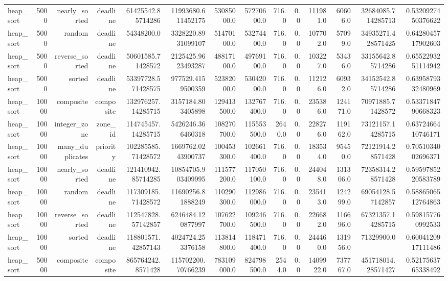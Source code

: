 \begin{table}[htbp]
\begin{tabular}{lrrrrrrrrrrrrr}
heap_sort & 5000 & nearly_sorted & deadline & 61425542.85714286 & 11993680.611452175 & 53085000.0 & 57270600.0 & 716.0 & 0.0 & 111981.0 & 60606.0 & 32684085.714285713 & 0.5320927450376622 \\
heap_sort & 5000 & random & deadline & 54348200.0 & 3328220.8931099107 & 51470100.0 & 53274400.0 & 716.0 & 0.0 & 107702.0 & 57099.0 & 34935271.428571425 & 0.6428045717902603 \\
heap_sort & 5000 & reverse_sorted & deadline & 50601585.71428572 & 2125425.9623493287 & 48817100.0 & 49769100.0 & 716.0 & 0.0 & 103227.0 & 53436.0 & 33155642.85714286 & 0.6552293251114942 \\
heap_sort & 5000 & sorted & deadline & 53397728.571428575 & 977529.4159500359 & 52382000.0 & 53042000.0 & 716.0 & 0.0 & 112126.0 & 60932.0 & 34152542.85714286 & 0.6395879332480969 \\
heap_sort & 10000 & composite & composite & 132976257.14285715 & 3157184.803405898 & 129413500.0 & 132767400.0 & 716.0 & 0.0 & 235386.0 & 124171.0 & 70971885.71428572 & 0.5337184790668323 \\
heap_sort & 10000 & integer_zone & zone_id & 114745457.14285715 & 5426246.366460318 & 108270700.0 & 115553500.0 & 2640.0 & 0.0 & 228276.0 & 119162.0 & 73121157.14285715 & 0.6372466410746171 \\
heap_sort & 10000 & many_duplicates & priority & 102285585.71428572 & 1669762.0243900737 & 100453300.0 & 102661400.0 & 716.0 & 0.0 & 183534.0 & 95450.0 & 72121914.28571428 & 0.7051034002696371 \\
heap_sort & 10000 & nearly_sorted & deadline & 121410942.85714285 & 10854705.903409995 & 111577200.0 & 117050100.0 & 716.0 & 0.0 & 244048.0 & 131306.0 & 72358314.28571428 & 0.5959785220583789 \\
heap_sort & 10000 & random & deadline & 117309185.71428572 & 11690256.81888249 & 110290300.0 & 112986000.0 & 716.0 & 0.0 & 235413.0 & 124299.0 & 69054128.57142857 & 0.5886506512764863 \\
heap_sort & 10000 & reverse_sorted & deadline & 112547828.57142857 & 6246484.120877997 & 107622700.0 & 109246500.0 & 716.0 & 0.0 & 226682.0 & 116696.0 & 67321357.14285715 & 0.598157760992533 \\
heap_sort & 10000 & sorted & deadline & 118801571.42857143 & 4024724.253376158 & 113814800.0 & 118471400.0 & 716.0 & 0.0 & 244460.0 & 131956.0 & 71329900.0 & 0.6004120917111486 \\
heap_sort & 50000 & composite & composite & 865764242.8571428 & 115702200.70766239 & 783109000.0 & 824798500.0 & 2544.0 & 0.0 & 1409922.0 & 737767.0 & 451718014.28571427 & 0.5217563765338492 \\

\end{tabular}
\end{table}
